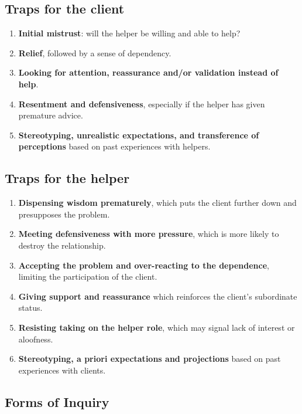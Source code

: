 \documentclass{article}
\newenvironment{nosepenumerate}
{ \begin{enumerate}
    \setlength{\itemsep}{0pt}
    \setlength{\parskip}{0pt}
    \setlength{\parsep}{0pt}     }
{ \end{enumerate}                  }
\begin{document}
\begin{multicols}{2}

\subsection{Traps for the client}
\begin{nosepenumerate}
    \item \textbf{Initial mistrust}: will the helper be willing and able to help?
    \item \textbf{Relief}, followed by a sense of dependency.
    \item \textbf{Looking for attention, reassurance and/or validation instead of help}.
    \item \textbf{Resentment and defensiveness}, especially if the helper has given premature advice.
    \item \textbf{Stereotyping, unrealistic expectations, and transference of perceptions} based on past experiences with helpers.
\end{nosepenumerate}

\vfill

\subsection{Traps for the helper}
\begin{nosepenumerate}
    \item \textbf{Dispensing wisdom prematurely}, which puts the client further down and presupposes the problem.
    \item \textbf{Meeting defensiveness with more pressure}, which is more likely to destroy the relationship.
    \item \textbf{Accepting the problem and over-reacting to the dependence}, limiting the participation of the client.
    \item \textbf{Giving support and reassurance} which reinforces the client's subordinate status.
    \item \textbf{Resisting taking on the helper role}, which may signal lack of interest or aloofness.
    \item \textbf{Stereotyping, a priori expectations and projections} based on past experiences with clients.
\end{nosepenumerate}

\end{multicols}

\begin{center}
\section{Forms of Inquiry}
\end{center}
\end{document}
